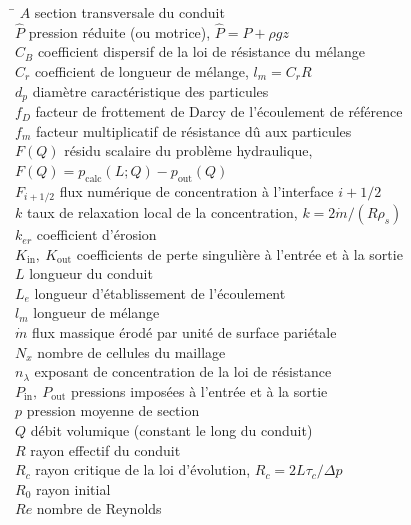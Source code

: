 \documentclass[11pt,a4paper]{report}
\newcommand{\kout}{K_{\mathrm{out}}}
\newcommand{\kin}{K_{\mathrm{in}}}
\newcommand{\mdot}{\dot{m}}
\newcommand{\Chat}{\hat{P}}
\begin{document}
\begin{tabbing}
\hspace{3.6cm}\=\kill
\(A\) \> section transversale du conduit \\
\(\Chat\) \> pression réduite (ou motrice), \(\Chat = P + \rho g z\) \\
\(C_B\) \> coefficient dispersif de la loi de résistance du mélange \\
\(C_r\) \> coefficient de longueur de mélange, \(l_m = C_r R\) \\
\(d_p\) \> diamètre caractéristique des particules \\
\(f_D\) \> facteur de frottement de Darcy de l'écoulement de référence \\
\(f_m\) \> facteur multiplicatif de résistance dû aux particules \\
\(F(Q)\) \> résidu scalaire du problème hydraulique, \(F(Q)=p_{\mathrm{calc}}(L;Q)-p_{\mathrm{out}}(Q)\) \\
\(F_{i+1/2}\) \> flux numérique de concentration à l'interface \(i+1/2\) \\
\(k\) \> taux de relaxation local de la concentration, \(k = 2\mdot/(R\rho_s)\) \\
\(k_{er}\) \> coefficient d'érosion \\
\(\kin,\ \kout\) \> coefficients de perte singulière à l'entrée et à la sortie \\
\(L\) \> longueur du conduit \\
\(L_e\) \> longueur d'établissement de l'écoulement \\
\(l_m\) \> longueur de mélange \\
\(\mdot\) \> flux massique érodé par unité de surface pariétale \\
\(N_x\) \> nombre de cellules du maillage \\
\(n_\lambda\) \> exposant de concentration de la loi de résistance \\
\(P_{\mathrm{in}},\ P_{\mathrm{out}}\) \> pressions imposées à l'entrée et à la sortie \\
\(p\) \> pression moyenne de section \\
\(Q\) \> débit volumique (constant le long du conduit) \\
\(R\) \> rayon effectif du conduit \\
\(R_c\) \> rayon critique de la loi d'évolution, \(R_c = 2L\tau_c/\Delta p\) \\
\(R_0\) \> rayon initial \\
\(Re\) \> nombre de Reynolds \\

\end{tabbing}
\end{document}
